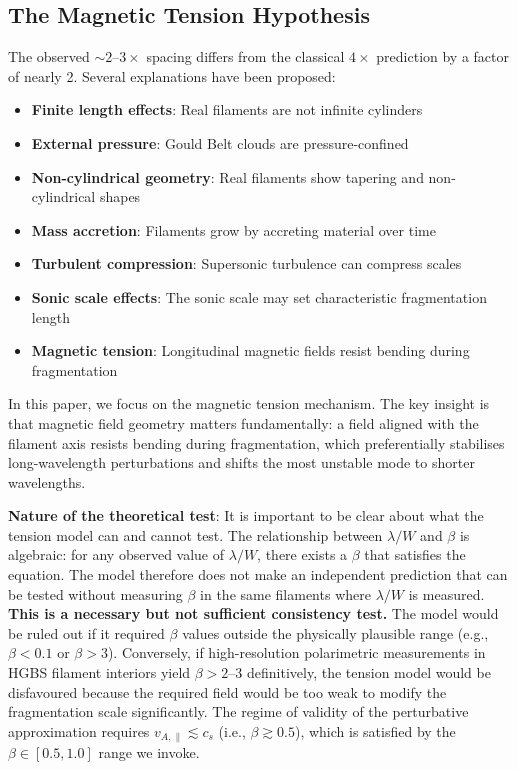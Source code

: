 \documentclass[11pt,a4paper]{article}
\begin{document}
\subsection{The Magnetic Tension Hypothesis}

The observed $\sim2$--$3\times$ spacing differs from the classical $4\times$ prediction by a factor of nearly 2. Several explanations have been proposed:

\begin{itemize}
    \item \textbf{Finite length effects}: Real filaments are not infinite cylinders \citep{Inutsuka1997}
    \item \textbf{External pressure}: Gould Belt clouds are pressure-confined \citep{Fischera2012}
    \item \textbf{Non-cylindrical geometry}: Real filaments show tapering and non-cylindrical shapes
    \item \textbf{Mass accretion}: Filaments grow by accreting material over time \citep{Heitsch2013, Chen2024}
    \item \textbf{Turbulent compression}: Supersonic turbulence can compress scales \citep{Padoan2011}
    \item \textbf{Sonic scale effects}: The sonic scale may set characteristic fragmentation length \citep{Federrath2016}
    \item \textbf{Magnetic tension}: Longitudinal magnetic fields resist bending during fragmentation
\end{itemize}

In this paper, we focus on the magnetic tension mechanism. The key insight is that magnetic field geometry matters fundamentally: a field aligned with the filament axis resists bending during fragmentation, which preferentially stabilises long-wavelength perturbations and shifts the most unstable mode to shorter wavelengths.

\textbf{Nature of the theoretical test}: It is important to be clear about what the tension model can and cannot test. The relationship between $\lambda/W$ and $\beta$ is algebraic: for any observed value of $\lambda/W$, there exists a $\beta$ that satisfies the equation. The model therefore does not make an independent prediction that can be tested without measuring $\beta$ in the same filaments where $\lambda/W$ is measured. \textbf{This is a necessary but not sufficient consistency test.} The model would be ruled out if it required $\beta$ values outside the physically plausible range (e.g., $\beta < 0.1$ or $\beta > 3$). Conversely, if high-resolution polarimetric measurements in HGBS filament interiors yield $\beta > 2$--$3$ definitively, the tension model would be disfavoured because the required field would be too weak to modify the fragmentation scale significantly. The regime of validity of the perturbative approximation requires $v_{A,\parallel} \lesssim c_s$ (i.e., $\beta \gtrsim 0.5$), which is satisfied by the $\beta \in [0.5, 1.0]$ range we invoke.
\end{document}
